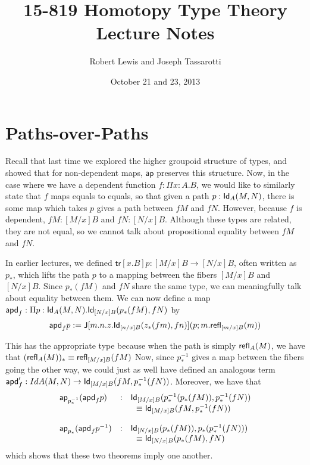 \documentclass[12pt]{article}
\newcommand{\ap}{\mathsf{ap}}
\newcommand{\apd}{\mathsf{apd}}
\newcommand{\tr}{\mathsf{tr}}
\begin{document}
\title{15-819 Homotopy Type Theory Lecture Notes} 
\author{Robert Lewis and Joseph Tassarotti}
\date{October 21 and 23, 2013}

\maketitle

\section{Paths-over-Paths}\label{}

Recall that last time we explored the higher groupoid structure of types, and
showed that for non-dependent maps, $\ap$ preserves this structure.  Now, in
the case where we have a dependent function $f : \Pi x: A.B$, we would like to
similarly state that $f$ maps equals to equals, so that given a path $p :
\mathsf{Id}_{A}(M,N)$, there is some map which takes $p$ gives a path between $f M$ and
$f N$. However, because $f$ is dependent, $f M : [M/x]B$ and $f N : [N/x] B$.
Although these types are related, they are not equal, so we cannot talk about
propositional equality between $f M$ and $f N$.

In earlier lectures, we defined $\tr[x.B]p : [M/x] B \to [N/x] B$, often
written as $p_*$, which lifts the path $p$ to a mapping between the fibers
$[M/x] B$ and $[N/x] B$. Since $p_*(f M)$ and $f N$ share the same type, we can
meaningfully talk about equality between them. We can now define a map $\apd_f
: \Pi p: \Id{A}(M, N). \Id{[N/x]B}(p_* (f M), f N)$ by
%
\[ \apd_f p := \J[m.n.z. \Id{[n/x]B}(z_{*}(f m), f n)](p ; m. \refl{[m/x]B}(m)) \]
%

This has the appropriate type because when the path is simply $\mathsf{refl}_{A}(M)$, we
have that $(\mathsf{refl}_{A}(M))_* \equiv \mathsf{refl}_{[M/x]B}(f M)$ Now, since $p_*^{-1}$
gives a map between the fibers going the other way, we could just as well have
defined an analogous term $\apd_f' : Id{A}(M, N) \to \Id{[M/x]B}(f M,
p_*^{-1}(f N))$. Moreover, we have that
%
\[
\begin{array}{lcl}
\ap_{p_*^{-1}} (\apd_f p) &:& \Id{[M/x]B}(p_*^{-1} (p_* (f M)), p_*^{-1} (f N))  \\
                          & &  \ \ \jdeq \Id{[M/x]B}(f M, p_*^{-1} (f N)) \\
\\
\ap_{p_*} (\apd_f p^{-1}) &:& \Id{[N/x]B}(p_* (f M)), p_* (p_*^{-1} (f N))) \\
                          & &  \ \ \jdeq \Id{[N/x]B}(p_* (f M), f N) \\

\end{array}
\]
%
which shows that these two theorems imply one another. 
\end{document}

